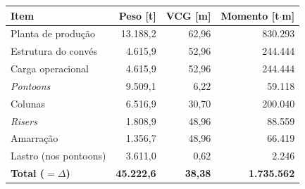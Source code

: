 \begin{tabular}{lrrr}
\toprule
Item & Peso [t] & VCG [m] & Momento [t$\cdot$m] \\
\midrule
Planta de produção & 13.188,2 & 62,96 & 830.293 \\
Estrutura do convés & 4.615,9 & 52,96 & 244.444 \\
Carga operacional & 4.615,9 & 52,96 & 244.444 \\
\emph{Pontoons} & 9.509,1 & 6,22 & 59.118 \\
Colunas & 6.516,9 & 30,70 & 200.040 \\
\emph{Risers} & 1.808,9 & 48,96 & 88.559 \\
Amarração & 1.356,7 & 48,96 & 66.419 \\
Lastro (nos pontoons) & 3.611,0 & 0,62 & 2.246 \\
\midrule
\textbf{Total ($=\Delta$)} & \textbf{45.222,6} & \textbf{38,38} & \textbf{1.735.562} \\
\bottomrule
\end{tabular}
